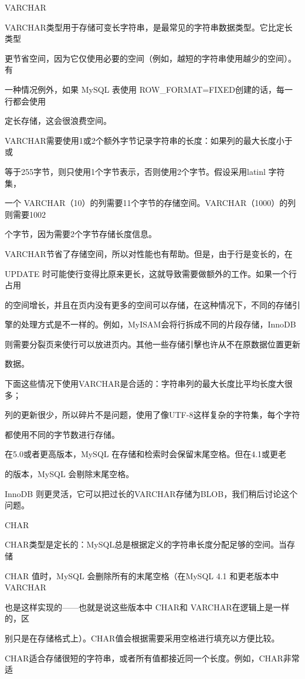 VARCHAR

VARCHAR类型用于存储可变长字符串，是最常见的字符串数据类型。它比定长类型

更节省空间，因为它仅使用必要的空间（例如，越短的字符串使用越少的空间）。有

一种情况例外，如果 MySQL 表使用 ROW\_FORMAT=FIXED创建的话，每一行都会使用

定长存储，这会很浪费空间。

VARCHAR需要使用1或2个额外字节记录字符串的长度：如果列的最大长度小于或

等于255字节，则只使用1个字节表示，否则使用2个字节。假设采用latinl 字符集，

一个 VARCHAR（10）的列需要11个字节的存储空间。VARCHAR（1000）的列则需要1002

个字节，因为需要2个字节存储长度信息。

VARCHAR节省了存储空间，所以对性能也有帮助。但是，由于行是变长的，在

UPDATE 时可能使行变得比原来更长，这就导致需要做额外的工作。如果一个行占用

的空间增长，并且在页内没有更多的空间可以存储，在这种情况下，不同的存储引

擎的处理方式是不一样的。例如，MyISAM会将行拆成不同的片段存储，InnoDB

则需要分裂页来使行可以放进页内。其他一些存储引擊也许从不在原数据位置更新

数据。

下面这些情况下使用VARCHAR是合适的：字符串列的最大长度比平均长度大很多；

列的更新很少，所以碎片不是问题，使用了像UTF-8这样复杂的字符集，每个字符

都使用不同的字节数进行存储。

在5.0或者更高版本，MySQL 在存储和检索时会保留末尾空格。但在4.1或更老

的版本，MySQL 会剔除末尾空格。

InnoDB 则更灵活，它可以把过长的VARCHAR存储为BLOB，我们稍后讨论这个问题。

CHAR

CHAR类型是定长的：MySQL总是根据定义的字符串长度分配足够的空间。当存储

CHAR 值时，MySQL 会删除所有的末尾空格（在MySQL 4.1 和更老版本中 VARCHAR

也是这样实现的——也就是说这些版本中 CHAR和 VARCHAR在逻辑上是一样的，区

别只是在存储格式上）。CHAR值会根据需要采用空格进行填充以方便比较。

CHAR适合存储很短的字符串，或者所有值都接近同一个长度。例如，CHAR非常适

